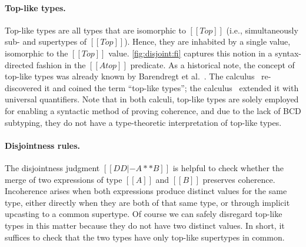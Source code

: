 \paragraph{Top-like types.}

Top-like types are all types that are isomorphic to $[[Top]]$ (i.e.,
simultaneously sub- and supertypes of $[[Top]]$). Hence, they are inhabited by a
single value, isomorphic to the $[[Top]]$ value. \cref{fig:disjoint:fi} captures
this notion in a syntax-directed fashion in the $[[A top]]$ predicate.
As a historical note, the concept of top-like types was already known by
Barendregt et al.~\cite{Barendregt_1983}. The \oname calculus~\cite{oliveira2016disjoint}
re-discovered it and coined the term ``top-like types''; the \fname calculus~\cite{alpuimdisjoint} extended it
with universal quantifiers. Note that in both calculi,
top-like types are solely employed for enabling a syntactic method of
proving coherence, and due to the lack of BCD subtyping, they do not have a
type-theoretic interpretation of top-like types.






\paragraph{Disjointness rules.}


The disjointness judgment $[[DD |- A ** B]]$ is helpful to check whether the merge of two
expressions of type $[[A]]$ and $[[B]]$ preserves coherence. Incoherence
arises when both expressions produce distinct values for the same type, either
directly when they are both of that same type, or through implicit upcasting to
a common supertype. Of course we can safely disregard top-like types in this matter
because they do not have two distinct values. In short, it suffices to check that the
two types have only top-like supertypes in common.

